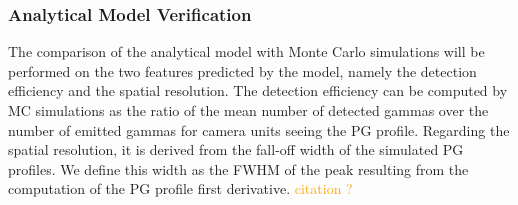 \documentclass[a4paper,english,12pt]{article}
\newcommand{\mr}[2]{\multirow{#1}{*}{#2}}
\newcommand{\ds}[2][orange]{\textcolor{#1}{#2}}
\begin{document}





\subsubsection{Analytical Model Verification}

The comparison of the analytical model with Monte Carlo simulations will be performed on the two features predicted by the model, namely the detection efficiency and the spatial resolution. The detection efficiency can be computed by MC simulations as the ratio of the mean number of detected gammas over the number of emitted gammas for camera units seeing the PG profile. Regarding the spatial resolution, it is derived from the fall-off width of the simulated PG profiles. We define this width as the FWHM of the peak resulting from the computation of the PG profile first derivative. \ds{citation ?}
\end{document}
